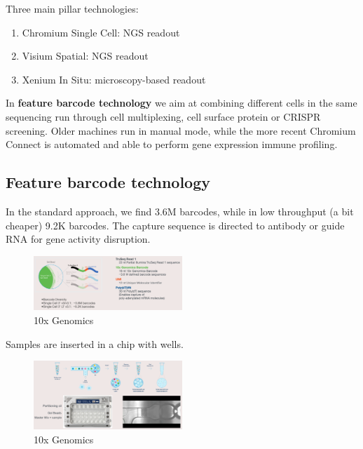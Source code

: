 Three main pillar technologies:

\begin{enumerate}
\def\labelenumi{\arabic{enumi}.}
\tightlist
\item
  Chromium Single Cell: NGS readout
\item
  Visium Spatial: NGS readout
\item
  Xenium In Situ: microscopy-based readout
\end{enumerate}

In \textbf{feature barcode technology} we aim at combining different
cells in the same sequencing run through cell multiplexing, cell surface
protein or CRISPR screening. Older machines run in manual mode, while
the more recent Chromium Connect is automated and able to perform gene
expression immune profiling.

\hypertarget{feature-barcode-technology}{%
\subsection{Feature barcode
technology}\label{feature-barcode-technology}}

In the standard approach, we find 3.6M barcodes, while in low throughput
(a bit cheaper) 9.2K barcodes. The capture sequence is directed to
antibody or guide RNA for gene activity disruption.

\begin{figure}
\centering
\includegraphics[width=0.5\textwidth]{images/Screenshot_4.png}
\caption{10x Genomics}
\end{figure}

Samples are inserted in a chip with wells.

\begin{figure}
\centering
\includegraphics[width=0.5\textwidth]{images/Screenshot_5.png}
\caption{10x Genomics}
\end{figure}

